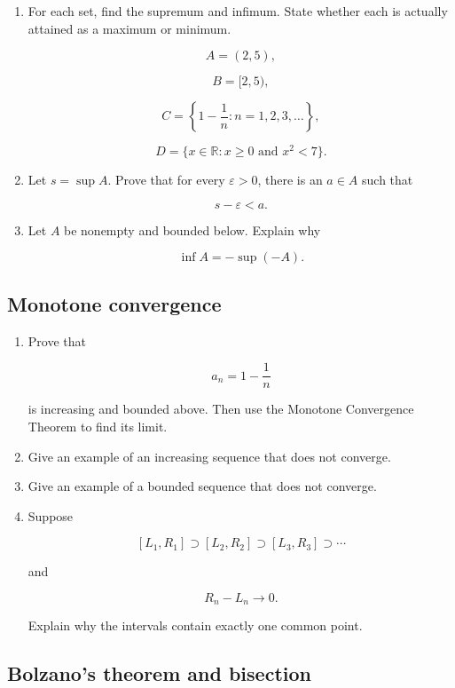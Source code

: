 \begin{enumerate}
\item For each set, find the supremum and infimum.  State whether each is actually
attained as a maximum or minimum.

\[
A=(2,5),
\]

\[
B=[2,5),
\]

\[
C=\left\{1-\frac1n:n=1,2,3,\ldots\right\},
\]

\[
D=\{x\in\mathbb R:x\ge0\text{ and }x^2<7\}.
\]

\item Let \(s=\sup A\).  Prove that for every \(\varepsilon>0\), there is an \(a\in A\)
such that

\[
s-\varepsilon<a.
\]

\item Let \(A\) be nonempty and bounded below.  Explain why

\[
\inf A=-\sup(-A).
\]
\end{enumerate}

\subsection*{Monotone convergence}

\begin{enumerate}
\item Prove that

\[
a_n=1-\frac1n
\]

is increasing and bounded above.  Then use the Monotone Convergence Theorem to find
its limit.

\item Give an example of an increasing sequence that does not converge.

\item Give an example of a bounded sequence that does not converge.

\item Suppose

\[
[L_1,R_1]\supset[L_2,R_2]\supset[L_3,R_3]\supset\cdots
\]

and

\[
R_n-L_n\to0.
\]

Explain why the intervals contain exactly one common point.
\end{enumerate}

\subsection*{Bolzano's theorem and bisection}

